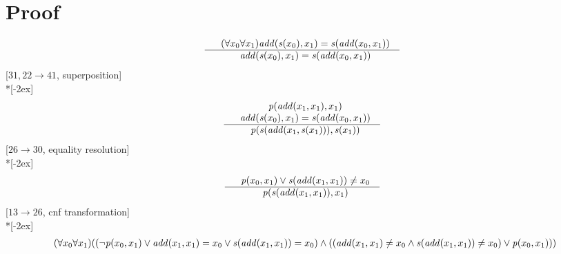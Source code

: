 \documentclass[fleqn]{article}
\newenvironment{VampireProof}{%
   \section{Proof}}{}
\newenvironment{VampireInference}{%
   \begin{array}{c}}{\end{array}}
\newenvironment{VampirePremise}%
   {\begin{array}{l}}%
   {\end{array}}
\newenvironment{VampireConclusion}%
   {\begin{array}{l}}%
   {\end{array}}
\newcommand{\VPremiseSeparator}{\\}
\newcommand{\VConclusionSeparator}{\\ \hline}
\newcommand{\Vor}{\vee}
\newcommand{\Vand}{\wedge}
\begin{document}
\begin{VampireProof}
\[\begin{VampireInference}
\begin{VampirePremise}%
~~(\forall x_{0} \forall x_{1} )\mathit{add} (\mathit{s} (x_{0}),x_{1}) = \mathit{s} (\mathit{add} (x_{0},x_{1}))
\end{VampirePremise}
\VConclusionSeparator
\begin{VampireConclusion}
~~\mathit{add} (\mathit{s} (x_{0}),x_{1}) = \mathit{s} (\mathit{add} (x_{0},x_{1}))
\end{VampireConclusion}
\end{VampireInference}
\]
[$31,22\rightarrow 41$, superposition]\\*[-2ex]
\[\begin{VampireInference}
\begin{VampirePremise}%
~~\mathit{p} (\mathit{add} (x_{1},x_{1}),x_{1})
\end{VampirePremise}
\VPremiseSeparator
\begin{VampirePremise}%
~~\mathit{add} (\mathit{s} (x_{0}),x_{1}) = \mathit{s} (\mathit{add} (x_{0},x_{1}))
\end{VampirePremise}
\VConclusionSeparator
\begin{VampireConclusion}
~~\mathit{p} (\mathit{s} (\mathit{add} (x_{1},\mathit{s} (x_{1}))),\mathit{s} (x_{1}))
\end{VampireConclusion}
\end{VampireInference}
\]
[$26\rightarrow 30$, equality resolution]\\*[-2ex]
\[\begin{VampireInference}
\begin{VampirePremise}%
~~\mathit{p} (x_{0},x_{1}) \Vor \mathit{s} (\mathit{add} (x_{1},x_{1})) \neq x_{0}
\end{VampirePremise}
\VConclusionSeparator
\begin{VampireConclusion}
~~\mathit{p} (\mathit{s} (\mathit{add} (x_{1},x_{1})),x_{1})
\end{VampireConclusion}
\end{VampireInference}
\]
[$13\rightarrow 26$, cnf transformation]\\*[-2ex]
\[\begin{VampireInference}
\begin{VampirePremise}%
~~(\forall x_{0} \forall x_{1} )((\neg \mathit{p} (x_{0},x_{1}) \Vor \mathit{add} (x_{1},x_{1}) = x_{0} \Vor \mathit{s} (\mathit{add} (x_{1},x_{1})) = x_{0}) \Vand ((\mathit{add} (x_{1},x_{1}) \neq x_{0} \Vand \mathit{s} (\mathit{add} (x_{1},x_{1})) \neq x_{0}) \Vor \mathit{p} (x_{0},x_{1})))

\end{VampirePremise}
\end{VampireInference}\]
\end{VampireProof}
\end{document}
